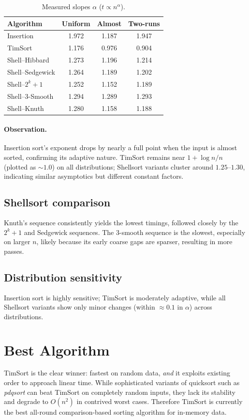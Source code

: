 \documentclass[11pt]{article}
\begin{document}
\begin{table}[ht]
\centering
\caption{Measured slopes $\alpha$ ($t\propto n^\alpha$).}
\label{tab:slopes}
\begin{tabular}{@{}lccc@{}}
\toprule
Algorithm & Uniform & Almost & Two-runs \\ \midrule
Insertion          & 1.972 & 1.187 & 1.947 \\
TimSort            & 1.176 & 0.976 & 0.904 \\
Shell–Hibbard      & 1.273 & 1.196 & 1.214 \\
Shell–Sedgewick    & 1.264 & 1.189 & 1.202 \\
Shell–$2^{k}{+}1$  & 1.252 & 1.152 & 1.189 \\
Shell–3-Smooth     & 1.294 & 1.289 & 1.293 \\
Shell–Knuth        & 1.280 & 1.158 & 1.188 \\ \bottomrule
\end{tabular}
\end{table}

\paragraph{Observation.}
Insertion sort’s exponent drops by nearly a full point when
the input is almost sorted, confirming its adaptive nature.
TimSort remains near $1+\log n/n$ (plotted as $\sim1.0$) on all
distributions; Shellsort variants cluster around $1.25$–$1.30$,
indicating similar asymptotics but different constant factors.

\subsection{Shellsort comparison}
Knuth’s sequence consistently yields the lowest timings, followed closely
by the $2^{k}+1$ and Sedgewick sequences.  The 3-smooth sequence is the
slowest, especially on larger $n$, likely because its early coarse gaps
are sparser, resulting in more passes.

\subsection{Distribution sensitivity}
Insertion sort is highly sensitive; TimSort is moderately adaptive, while
all Shellsort variants show only minor changes (within ${\approx}0.1$ in
$\alpha$) across distributions.

\section{Best Algorithm}
TimSort is the clear winner: fastest on random data, \emph{and} it
exploits existing order to approach linear time.  While sophisticated
variants of quicksort such as \emph{pdqsort} can beat TimSort on
completely random inputs, they lack its stability and degrade to
$O(n^{2})$ in contrived worst cases.  Therefore TimSort is currently the
best all-round comparison-based sorting algorithm for in-memory data.
\end{document}
